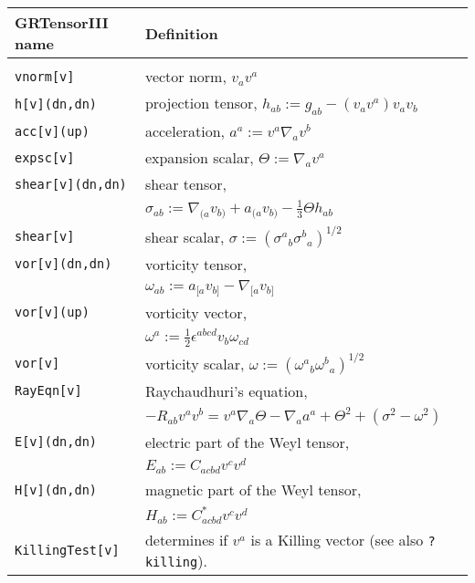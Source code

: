 \documentclass{article}
\begin{document}
{{{\renewcommand{\baselinestretch}{1.5}\normalsize
\begin{longtable}[c]{lp{}}\hline\hline
GRTensorIII name & Definition \cite{ehlers:1993}\\ \hline
& \\
\texttt{vnorm[v]}	& vector norm, $v_a v^a$ \\
\texttt{h[v](dn,dn)}	& projection tensor, 
                        $h_{ab} := g_{ab} - (v_a v^a) v_a v_b$ \\
\texttt{acc[v](up)}	& acceleration, $a^a := v^a \nabla_a v^b$ \\
\texttt{expsc[v]}	& expansion scalar, $\Theta := \nabla_a v^a$ \\
\texttt{shear[v](dn,dn)}& shear tensor, \\
			& $\sigma_{ab} := \nabla_{(a} v_{b)}
			  + a_{(a} v_{b)} - \frac{1}{3} \Theta h_{ab}$\\
\texttt{shear[v]}	& shear scalar, $ \sigma 
			:= (\sigma^a{}_b \sigma^b{}_a)^{1/2}$\\
\texttt{vor[v](dn,dn)}	& vorticity tensor, \\
			& $\omega_{ab} := a_{[a} v_{b]}- \nabla_{[a} v_{b]}$\\
\texttt{vor[v](up)}	& vorticity vector,\\ & $\omega^a
			:= \frac{1}{2}\epsilon^{abcd} v_b \omega_{cd}$\\
\texttt{vor[v]}		& vorticity scalar, $\omega 
			:= (\omega^a{}_b \omega^b{}_a)^{1/2}$\\
\texttt{RayEqn[v]}	& Raychaudhuri's equation,\\
			& $ -R_{ab} v^a v^b = v^a \nabla_a\Theta
			- \nabla_a a^a + \Theta^2 + (\sigma^2 - \omega^2)$ \\
\texttt{E[v](dn,dn)}	& electric part of the Weyl tensor, \\
			& $E_{ab} := C_{acbd} v^c v^d$ \\
\texttt{H[v](dn,dn)}	& magnetic part of the  Weyl tensor, \\
			& $H_{ab} := C^*_{acbd} v^c v^d$ \\
\texttt{KillingTest[v]}	& determines if $v^a$ is a Killing 
			  vector (see also \texttt{?killing}).\\
\hline
\end{longtable}
\renewcommand{\baselinestretch}{1}\normalsize
%
\vfill


\pagebreak
}}}
\end{document}
